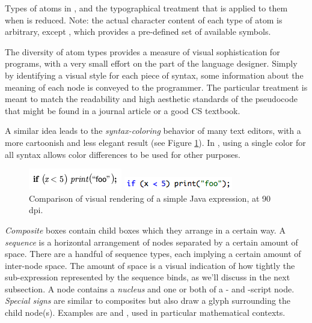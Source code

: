 \begin{table}
\vspace{6pt}

\caption{Types of atoms in , and the typographical treatment that is applied to them when  is reduced. Note: the actual character content of each type of atom is arbitrary, except , which provides a pre-defined set of available symbols.}
\label{fig-atoms}
\end{table}

The diversity of atom types provides a measure of visual sophistication for programs, with a very small effort on the part of the language designer. Simply by identifying a visual style for each piece of syntax, some information about the meaning of each node is conveyed to the programmer. The particular treatment is meant to match the readability and high aesthetic standards of the pseudocode that might be found in a journal article or a good CS textbook.

A similar idea leads to the \emph{syntax-coloring} behavior of many text editors, with a more cartoonish and less elegant result (see Figure \ref{fig-syntax-coloring}). In \Meta, using a single color for all syntax allows color differences to be used for other purposes.

\begin{figure}[ht]
  \includegraphics[scale=0.8]{src/image/if.png}
  
  \includegraphics[scale=0.8]{src/image/if-text.png}

  \caption{\label{fig-syntax-coloring}Comparison of visual rendering of a simple Java expression, at 90 dpi. }
\end{figure}

\emph{Composite} boxes contain child boxes which they arrange in a certain way. A \emph{sequence} is a horizontal arrangement of nodes separated by a certain amount of space. There are a handful of sequence types, each implying a certain amount of inter-node space. The amount of space is a visual indication of how tightly the sub-expression represented by the sequence binds, as we'll discuss in the next subsection. A  node contains a \emph{nucleus} and one or both of a - and -script node. \emph{Special signs} are similar to composites but also draw a glyph surrounding the child node(s). Examples are  and , used in particular mathematical contexts.


